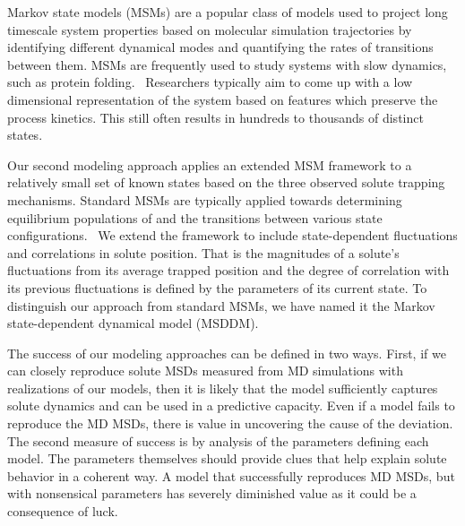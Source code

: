 \documentclass{article}
\begin{document}
  Markov state models (MSMs) are a popular class of models used to project long timescale
  system properties based on molecular simulation trajectories by identifying
  different dynamical modes and quantifying the rates of transitions between them.
  MSMs are frequently used to study systems with slow dynamics, such as protein 
  folding.~\cite{snow_how_2005,chodera_automatic_2007} Researchers typically aim to 
  come up with a low dimensional representation of the system based on features 
  which preserve the process kinetics. This still often results in hundreds to thousands
  of distinct states.~\cite{chodera_markov_2014}

  Our second modeling approach applies an extended MSM framework to a relatively 
  small set of known states based on the three observed solute trapping mechanisms.  
  Standard MSMs are typically applied towards determining equilibrium populations
  of and the transitions between various state configurations.~\cite{bowman_using_2009} 
  We extend the framework to include state-dependent fluctuations and correlations in 
  solute position. 
  That is the magnitudes of a solute's fluctuations from its average trapped 
  position and the degree of correlation with its previous fluctuations is 
  defined by the parameters of its current state. To distinguish our approach from
  standard MSMs, we have named it the Markov state-dependent dynamical model (MSDDM).
  
  The success of our modeling approaches can be defined in two ways. First, if we
  can closely reproduce solute MSDs measured from MD simulations with realizations
  of our models, then it is likely that the model sufficiently captures solute 
  dynamics and can be used in a predictive capacity. Even if a model fails to 
  reproduce the MD MSDs, there is value in uncovering the cause of the deviation.
  The second measure of success is by analysis of the parameters defining each 
  model. The parameters themselves should provide clues that help explain solute 
  behavior in a coherent way. A model that successfully reproduces MD MSDs, but 
  with nonsensical parameters has severely diminished value as it could be a 
  consequence of luck.
  
\end{document}
